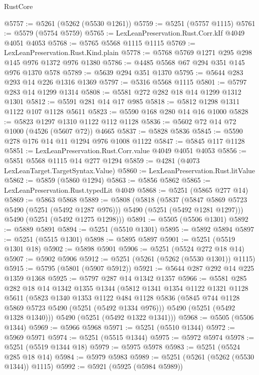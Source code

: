 \begin{lexlean}{RustCore}
\begin{coremodule}
@5757 := @5261 (@5262 (@5530 @1261))
@5759 := @5251 (@5757 @1115)
@5761 := @5579 (@5754 @5759)
@5765 := LexLeanPreservation.Rust.Corr.kIf @4049 @4051 @4053
@5768 := @5765 @5568 @1115 @1115
@5769 := LexLeanPreservation.Rust.Kind.plain
@5778 := @5768 @5769 @1271 @295 @298 @145 @976 @1372 @976 @1380
@5786 := @4485 @5568 @67 @294 @351 @145 @976 @1370 @578
@5789 := @5639 @294 @351 @1370
@5795 := @5644 @283 @293 @14 @226 @1316 @1369
@5797 := @5316 @5568 @1115
@5801 := @5797 @283 @14 @1299 @1314
@5808 := @5581 @272 @282 @18 @14 @1299 @1312 @1301
@5812 := @5591 @281 @14 @17 @985
@5818 := @5812 @1298 @1311 @1122 @107 @1128 @5611
@5823 := @5590 @168 @280 @14 @16 @1000
@5828 := @5823 @1297 @1310 @1122 @112 @1128
@5836 := @5602 @72 @14 @72 @1000 (@4526 (@5607 @72)) @4665
@5837 := @5828 @5836
@5845 := @5590 @278 @176 @14 @11 @1294 @976 @1008 @1122
@5847 := @5845 @117 @1128
@5851 := LexLeanPreservation.Rust.Corr.value @4049 @4051 @4053
@5856 := @5851 @5568 @1115 @14 @277 @1294
@5859 := @4281 (@4073 LexLeanTarget.TargetSyntax.Value)
@5860 := LexLeanPreservation.Rust.litValue
@5862 := @5859 (@5860 @1294)
@5863 := @5856 @5862
@5865 := LexLeanPreservation.Rust.typedLit @4049
@5868 := @5251 (@5865 @277 @14)
@5869 := @5863 @5868
@5889 := @5808
    (@5818
      (@5837 (@5847 @5869 @5723 @5490 (@5251 (@5492 @1287 @976))) @5490 (@5251 (@5492 @1281 @1297)))
      @5490
      (@5251 (@5492 @1275 @1298)))
@5891 := @5505 (@5506 @1301)
@5892 := @5889 @5891
@5894 := @5251 (@5510 @1301)
@5895 := @5892 @5894
@5897 := @5251 (@5515 @1301)
@5898 := @5895 @5897
@5901 := @5251 (@5519 @1301 @18)
@5902 := @5898 @5901
@5906 := @5251 (@5524 @272 @18 @14)
@5907 := @5902 @5906
@5912 := @5251 (@5261 (@5262 (@5530 @1301)) @1115)
@5915 := @5795 (@5801 (@5907 @5912))
@5921 := @5644 @287 @292 @14 @225 @1359 @1368
@5925 := @5797 @287 @14 @1342 @1357
@5966 := @5581
    @285
    @282
    @18
    @14
    @1342
    @1355
    @1344
    (@5812
      @1341
      @1354
      @1122
      @1321
      @1128
      @5611
      (@5823
        @1340
        @1353
        @1122
        @484
        @1128
        @5836
        (@5845 @744 @1128 @5869 @5723 @5490 (@5251 (@5492 @1334 @976)))
        @5490
        (@5251 (@5492 @1328 @1340)))
      @5490
      (@5251 (@5492 @1322 @1341)))
@5968 := @5505 (@5506 @1344)
@5969 := @5966 @5968
@5971 := @5251 (@5510 @1344)
@5972 := @5969 @5971
@5974 := @5251 (@5515 @1344)
@5975 := @5972 @5974
@5978 := @5251 (@5519 @1344 @18)
@5979 := @5975 @5978
@5983 := @5251 (@5524 @285 @18 @14)
@5984 := @5979 @5983
@5989 := @5251 (@5261 (@5262 (@5530 @1344)) @1115)
@5992 := @5921 (@5925 (@5984 @5989))

\end{coremodule}
\end{lexlean}
